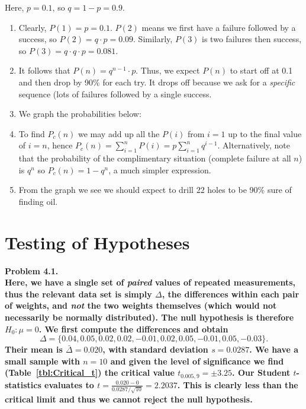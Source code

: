 Here, $p = 0.1$, so $q = 1 - p = 0.9$.
\begin{enumerate}[label=\alph*)]
\item Clearly, $P(1) = p = 0.1$.  $P(2)$ means we first have
a failure followed by a success, so $P(2) = q \cdot p = 0.09$.  Similarly, $P(3)$ is two failures then success, so
$P(3) = q \cdot q \cdot p = 0.081$.
\item It follows that $P(n) = q^{n-1}\cdot p$.  Thus, we expect $P(n)$ to start off at 0.1 and then drop by 90\% for
each try.  It drops off because we ask for a \emph{specific} sequence (lots of failures followed by a single success.
\item We graph the probabilities below:
\item To find $P_c(n)$ we may add up all the $P(i)$ from $i = 1$ up to the final value of $i = n$, hence
$P_c(n) = \sum_{i=1}^{n} P(i) = p\sum_{i=1}^{n} q^{i - 1}$.  Alternatively, note that the probability of the
complimentary situation (complete failure at all $n$) is $q^n$ so $P_c(n) = 1 - q^n$, a much simpler expression.
\item From the graph we see we should expect to drill 22 holes to be 90\% sure of finding oil.
\end{enumerate}

\section{Testing of Hypotheses}

\noindent
\bf{Problem 4.1.} \\

Here, we have a single set of \emph{paired} values of repeated measurements, thus
the relevant data set is simply $\Delta$, the differences within each pair of weights, and \emph{not} the two
weights themselves (which would not necessarily be normally distributed). The null hypothesis
is therefore $H_0: \mu = 0$.  We first compute the differences and obtain
\[
\Delta = \{0.04, 0.05, 0.02, 0.02, -0.01, 0.02, 0.05, -0.01, 0.05, -0.03\}.
\]
Their mean is $\bar{\Delta} = 0.020$, with standard deviation $s = 0.0287$.  We have a small sample with $n = 10$
and given the level of significance we find (Table~\ref{tbl:Critical_t}) the critical value $t_{0.005,9} = \pm 3.25$.
Our Student $t$-statistics evaluates to $t = \frac{0.020 - 0}{0.0287/\sqrt{10}} = 2.2037$.  This is clearly less
than the critical limit and thus we cannot reject the null hypothesis.
\\

